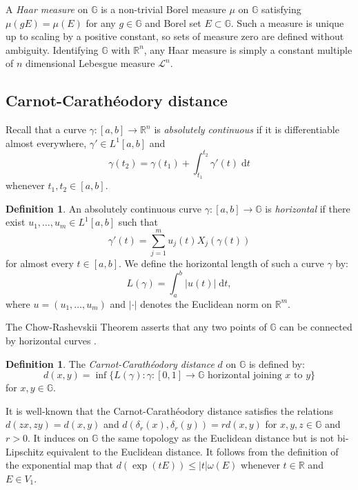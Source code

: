 \documentclass[reqno, 11pt]{amsart}
\theoremstyle{definition}
\newtheorem{definition}[theorem]{Definition}
\theoremstyle{remark}
\numberwithin{theorem}{section}
\numberwithin{equation}{section}
\begin{document}
A \emph{Haar measure} on $\mathbb{G}$ is a non-trivial Borel measure $\mu$ on $\mathbb{G}$ satisfying $\mu(gE)=\mu(E)$ for any $g\in \mathbb{G}$ and Borel set $E\subset \mathbb{G}$. Such a measure is unique up to scaling by a positive constant, so sets of measure zero are defined without ambiguity. Identifying ${\mathbb{G}}$ with $\mathbb{R}^n$, any Haar measure is simply a constant multiple of $n$ dimensional Lebesgue measure $\mathcal{L}^{n}$.

\subsection{Carnot-Carath\'eodory distance}

Recall that a curve $\gamma\colon [a,b]\to \mathbb{R}^{n}$ is \emph{absolutely continuous} if it is differentiable almost everywhere, $\gamma' \in L^{1}[a,b]$ and
\[\gamma(t_{2})=\gamma(t_{1})+\int_{t_{1}}^{t_{2}} \gamma'(t){\; \mathrm{d}} t\]
whenever $t_{1}, t_{2}\in [a,b]$.

\begin{definition}\label{horizontalcurve}
An absolutely continuous curve $\gamma\colon [a,b]\to \mathbb{G}$ is \emph{horizontal} if there exist $u_{1}, \ldots, u_{m}\in L^{1}[a,b]$ such that
\[\gamma'(t)=\sum_{j=1}^{m}u_{j}(t)X_{j}(\gamma(t))\]
for almost every $t\in [a,b]$. We define the horizontal length of such a curve $\gamma$ by:
\[L(\gamma)=\int_{a}^{b}|u(t)|{\; \mathrm{d}} t,\]
where $u=(u_{1}, \ldots, u_{m})$ and $|\cdot|$ denotes the Euclidean norm on $\mathbb{R}^{m}$.
\end{definition}

The Chow-Rashevskii Theorem asserts that any two points of $\mathbb{G}$ can be connected by horizontal curves \cite[Theorem 9.1.3]{BLU}.

\begin{definition}
The \emph{Carnot-Carath\'eodory distance} $d$ on $\mathbb{G}$ is defined by:
\[d(x,y)=\inf \{ L(\gamma) : \gamma \colon [0,1]\to \mathbb{G} \mbox{ horizontal joining }x\mbox{ to }y \}\]
for $x, y\in \mathbb{G}$.
\end{definition}

It is well-known that the Carnot-Carath\'eodory distance satisfies the relations $d(zx,zy)=d(x,y)$ and $d(\delta_{r}(x),\delta_{r}(y))=rd(x,y)$ for $x, y, z\in \mathbb{G}$ and $r>0$. It induces on $\mathbb{G}$ the same topology as the Euclidean distance but is not bi-Lipschitz equivalent to the Euclidean distance. It follows from the definition of the exponential map that $d(\exp(tE))\leq |t|\omega (E)$ whenever $t\in \mathbb{R}$ and $E\in V_{1}$.
\end{document}
